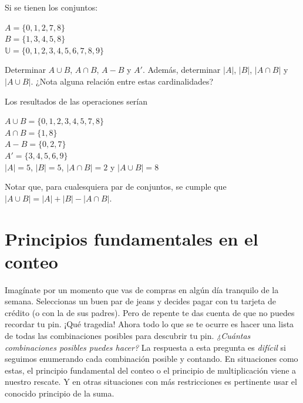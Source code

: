 \begin{ejemplo}
    Si se tienen los conjuntos:

    \begin{center}
        $A =\{0, 1, 2, 7, 8\}$ \\
        $B =\{1, 3, 4, 5, 8\}$ \\
        $\mathbb{U} =\{0, 1, 2, 3, 4, 5, 6, 7, 8, 9\}$
    \end{center}

    Determinar $A \cup B$, $A \cap B$, $A-B$ y $A'$. Además, determinar $|A|$, $|B|$, $|A \cap B|$ y $|A \cup B|$. ¿Nota alguna relación entre estas cardinalidades?
    
\end{ejemplo}

\begin{solucion} Los resultados de las operaciones serían

    \begin{center}
        $A \cup B=\{0,1,2,3,4,5,7,8\}$ \\
        $A \cap B=\{1,8\}$ \\
        $A-B=\{0,2,7\}$ \\
        $A'=\{3,4,5,6,9\}$ \\
        $|A|=5$, $|B|=5$, $|A \cap B|=2$ y $|A \cup B|=8$
    \end{center}

    Notar que, para cualesquiera par de conjuntos, se cumple que $|A \cup B| = |A| + |B| - |A \cap B|$.
    
\end{solucion}

\section{Principios fundamentales en el conteo}
Imagínate por un momento que vas de compras en algún día tranquilo de la semana. Seleccionas un buen par de jeans y decides pagar con tu tarjeta de crédito (o con la de sus padres). Pero de repente te das cuenta de que no puedes recordar tu pin. ¡Qué tragedia! Ahora todo lo que se te ocurre es hacer una lista de todas las combinaciones posibles para descubrir tu pin. \textit{¿Cuántas combinaciones posibles puedes hacer?} La respuesta a esta pregunta es \textit{difícil} si seguimos enumerando cada combinación posible y contando. En situaciones como estas, el principio fundamental del conteo o el principio de multiplicación viene a nuestro rescate. Y en otras situaciones con más restricciones es pertinente usar el conocido principio de la suma. %
